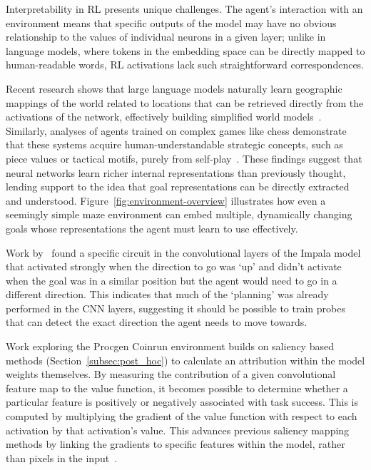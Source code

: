 Interpretability in RL presents unique challenges. The agent's interaction with an environment means that specific outputs of the model may have no obvious relationship to the values of individual neurons in a given layer; unlike in language models, where tokens in the embedding space can be directly mapped to human-readable words, RL activations lack such straightforward correspondences.

Recent research shows that large language models naturally learn geographic mappings of the world related to locations that can be retrieved directly from the activations of the network, effectively building simplified world models~\citep{gurnee2023language}. Similarly, analyses of agents trained on complex games like chess demonstrate that these systems acquire human-understandable strategic concepts, such as piece values or tactical motifs, purely from self-play~\citep{mcgrath_2022_acquisition}. These findings suggest that neural networks learn richer internal representations than previously thought, lending support to the idea that goal representations can be directly extracted and understood. Figure~\ref{fig:environment-overview} illustrates how even a seemingly simple maze environment can embed multiple, dynamically changing goals whose representations the agent must learn to use effectively.

Work by~\citet{betley_2023_localizing} found a specific circuit in the convolutional layers of the Impala model that activated strongly when the direction to go was `up' and didn't activate when the goal was in a similar position but the agent would need to go in a different direction. This indicates that much of the `planning' was already performed in the CNN layers, suggesting it should be possible to train probes that can detect the exact direction the agent needs to move towards.

Work exploring the Procgen Coinrun environment builds on saliency based methods (Section~\ref{subsec:post_hoc}) to calculate an attribution within the model weights themselves. By measuring the contribution of a given convolutional feature map to the value function, it becomes possible to determine whether a particular feature is positively or negatively associated with task success. This is computed by multiplying the gradient of the value function with respect to each activation by that activation's value. This advances previous saliency mapping methods by linking the gradients to specific features within the model, rather than pixels in the input~\citep{hilton_2020_understanding}.

